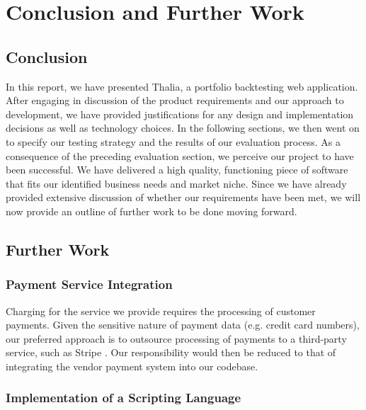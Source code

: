 \documentclass[main.tex]{subfiles}
\begin{document}
\section{Conclusion and Further Work}


\subsection{Conclusion}

In this report, we have presented Thalia, a portfolio backtesting web application. After engaging in discussion of the product requirements and our approach to development, we have provided justifications for any design and implementation decisions as well as technology choices. In the following sections, we then went on to specify our testing strategy and the results of our evaluation process. \newline
As a consequence of the preceding evaluation section, we perceive our project to have been successful. We have delivered a high quality, functioning piece of software that fits our identified business needs and market niche. Since we have already provided extensive discussion of whether our requirements have been met, we will now provide an outline of further work to be done moving forward.

\subsection{Further Work}

\subsubsection{Payment Service Integration}

Charging for the service we provide requires the processing of customer payments. Given the sensitive nature of payment data (e.g. credit card numbers), our preferred approach is to outsource processing of payments to a third-party service, such as Stripe \cite{stripe}. Our responsibility would then be reduced to that of integrating the vendor payment system into our codebase.

\subsubsection{Implementation of a Scripting Language}
\end{document}
